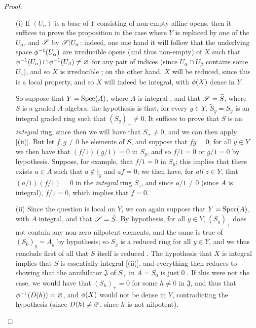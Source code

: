 \begin{proof}
\medskip\noindent
\begin{enumerate}
  \item[(i)] If $(U_\alpha)$ is a base of $Y$ consisting of non-empty affine opens, then it suffices to prove the proposition in the case where $Y$ is replaced by one of the $U_\alpha$, and $\mathscr{S}$ by $\mathscr{S}|U_\alpha$:
    indeed, one one hand it will follow that the underlying space $\phi^{-1}(U_\alpha)$ are irreducible opens (and thus non-empty) of $X$ such that $\phi^{-1}(U_\alpha)\cap\phi^{-1}(U_\beta)\neq\varnothing$ for any pair of indices (since $U_\alpha\cap U_\beta$ contains some $U_\gamma$), and so $X$ is irreducible ;
    on the other hand, $X$ will be reduced, since this is a local property, and so $X$ will indeed be integral, with $\phi(X)$ dense in $Y$.

    So suppose that $Y=\operatorname{Spec}(A)$, where $A$ is integral , and that $\mathscr{S}=\widetilde{S}$, where $S$ is a graded $A$-algebra;
    the hypothesis is that, for every $y\in Y$, $\widetilde{S}_y=S_y$ is an integral graded ring such that $(S_y)_+\neq0$.
    It suffices to prove that $S$ is an \emph{integral} ring, since then we will have that $S_+\neq0$, and we can then apply [(ii)].
    But let $f,g\neq0$ be elements of $S$, and suppose that $fg=0$;
    for all $y\in Y$ we then have that $(f/1)(g/1)=0$ in $S_y$, and so $f/1=0$ or $g/1=0$ by hypothesis.
    Suppose, for example, that $f/1=0$ in $S_y$;
    this implies that there exists $a\in A$ such that $a\not\in\mathfrak{j}_y$ and $af=0$;
    we then have, for \emph{all} $z\in Y$, that $(a/1)(f/1)=0$ in the \emph{integral} ring $S_z$, and since $a/1\neq0$ (since $A$ is integral), $f/1=0$, which implies that $f=0$.
  \item[(ii)] Since the question is local on $Y$, we can again suppose that $Y=\operatorname{Spec}(A)$, with $A$ integral, and that $\mathscr{S}=\widetilde{S}$.
    By hypothesis, for all $y\in Y$, $(S_y)_+$ does not contain any non-zero nilpotent elements, and the same is true of $(S_0)_y=A_y$ by hypothesis;
    so $S_y$ is a reduced ring for all $y\in Y$, and we thus conclude first of all that $S$ itself is reduced .
    The hypothesis that $X$ is integral implies that $S$ is essentially integral [(ii)], and everything then reduces to showing that the annihilator $\mathfrak{J}$ of $S_+$ in $A=S_0$ is just $0$ .
    If this were not the case, we would have that $(S_h)_+=0$ for some $h\neq0$ in $\mathfrak{J}$, and thus  that $\phi^{-1}(D(h))=\varnothing$, and $\phi(X)$ would not be dense in $Y$, contradicting the hypothesis (since $D(h)\neq\varnothing$, since $h$ is not nilpotent).
\end{enumerate}
\end{proof}


